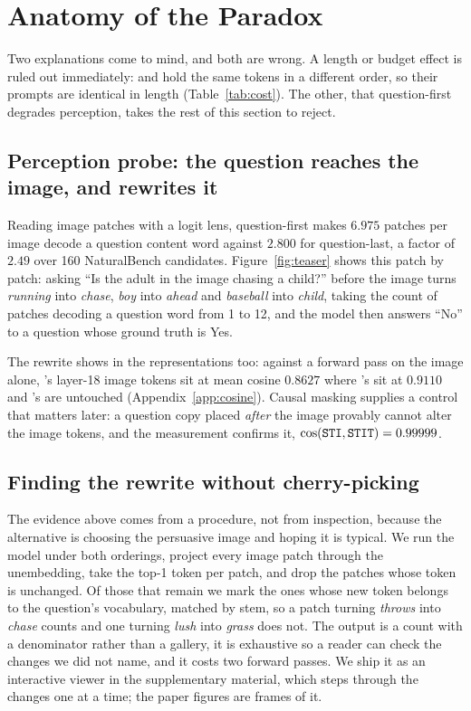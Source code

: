 \section{Anatomy of the Paradox}
\label{sec:anatomy}

Two explanations come to mind, and both are wrong. A length or budget effect is
ruled out immediately: \sti{} and \sit{} hold the same tokens in a different
order, so their prompts are identical in length (Table~\ref{tab:cost}). The
other, that question-first degrades perception, takes the rest of this section
to reject.

\subsection{Perception probe: the question reaches the image, and rewrites it}
\label{sec:anatomy-steering}

Reading image patches with a logit lens, question-first makes $6.975$ patches
per image decode a question content word against $2.800$ for question-last, a
factor of $2.49$ over 160 NaturalBench candidates. Figure~\ref{fig:teaser}
shows this patch by patch: asking ``Is the adult in the image chasing a child?''
before the image turns \emph{running} into \emph{chase}, \emph{boy} into
\emph{ahead} and \emph{baseball} into \emph{child}, taking the count of patches
decoding a question word from 1 to 12, and the model then answers ``No'' to a
question whose ground truth is Yes.

The rewrite shows in the representations too: against a forward pass on the
image alone, \sti{}'s layer-18 image tokens sit at mean cosine $0.8627$ where
\sit{}'s sit at $0.9110$ and \ist{}'s are untouched
(Appendix~\ref{app:cosine}). Causal masking supplies a control that matters
later: a question copy placed \emph{after} the image provably cannot alter the
image tokens, and the measurement confirms it,
$\cos(\texttt{STI}{}, \texttt{STIT}{}) = 0.99999$.


\subsection{Finding the rewrite without cherry-picking}
\label{sec:anatomy-diff}

The evidence above comes from a procedure, not from inspection, because the
alternative is choosing the persuasive image and hoping it is typical. We run
the model under both orderings, project every image patch through the
unembedding, take the top-1 token per patch, and drop the patches whose token is
unchanged. Of those that remain we mark the ones whose new token belongs to the
question's vocabulary, matched by stem, so a patch turning \emph{throws} into
\emph{chase} counts and one turning \emph{lush} into \emph{grass} does not. The
output is a count with a denominator rather than a gallery, it is exhaustive so
a reader can check the changes we did not name, and it costs two forward passes.
We ship it as an interactive viewer in the supplementary material, which steps
through the changes one at a time; the paper figures are frames of it.

